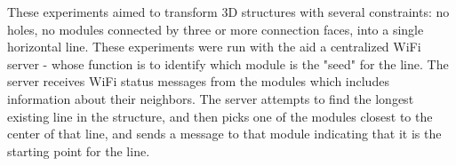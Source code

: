 These experiments aimed to transform 3D structures with several constraints: no holes, no modules connected by three or more connection faces, into a single horizontal line. These experiments were run with the aid a centralized WiFi server - whose function is to identify which module is the "seed" for the line. The server receives WiFi  status messages from the modules which includes information about their neighbors. The server attempts to find the longest existing line in the structure, and then picks one of the modules closest to the center of that line, and sends a message to that module indicating that it is the starting point for the line. 


\begin{figure}[h]  
	\centering
	\begin{subfigure}[b]{0.32\linewidth}
	\end{subfigure}
	\begin{subfigure}[b]{0.32\linewidth}
\end{subfigure}
\end{figure}

